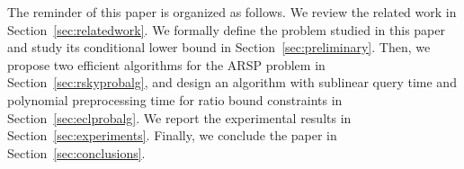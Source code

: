 The reminder of this paper is organized as follows.
We review the related work in Section~\ref{sec:relatedwork}.
We formally define the problem studied in this paper and study its conditional lower bound in Section~\ref{sec:preliminary}.
Then, we propose two efficient algorithms for the ARSP problem in Section~\ref{sec:rskyprobalg}, and design an algorithm with sublinear query time and polynomial preprocessing time for ratio bound constraints in Section~\ref{sec:eclprobalg}.
We report the experimental results in Section~\ref{sec:experiments}.
Finally, we conclude the paper in Section~\ref{sec:conclusions}.